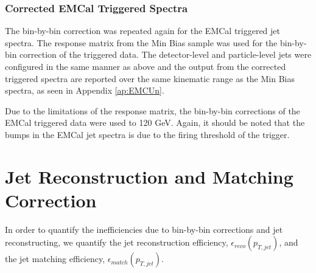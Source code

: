 


\subsubsection{Corrected EMCal Triggered Spectra}
The bin-by-bin correction was repeated again for the EMCal triggered jet spectra.  The response matrix from the Min Bias sample was used for the bin-by-bin correction of the triggered data.  The detector-level and particle-level jets were configured in the same manner as above and the output from the corrected triggered spectra are reported over the same kinematic range as the Min Bias spectra, as seen in Appendix \ref{ap:EMCUn}.

Due to the limitations of the response matrix, the bin-by-bin corrections of the EMCal triggered data were used to 120 GeV.  Again, it should be noted that the bumps in the EMCal jet spectra is due to the firing threshold of the trigger.

\section{Jet Reconstruction and Matching Correction}
In order to quantify the inefficiencies due to bin-by-bin corrections and jet reconstructing, we quantify the jet reconstruction efficiency, $\epsilon_{reco} (p_{T, jet})$, and the jet matching efficiency, $\epsilon_{match} (p_{T, jet})$.


